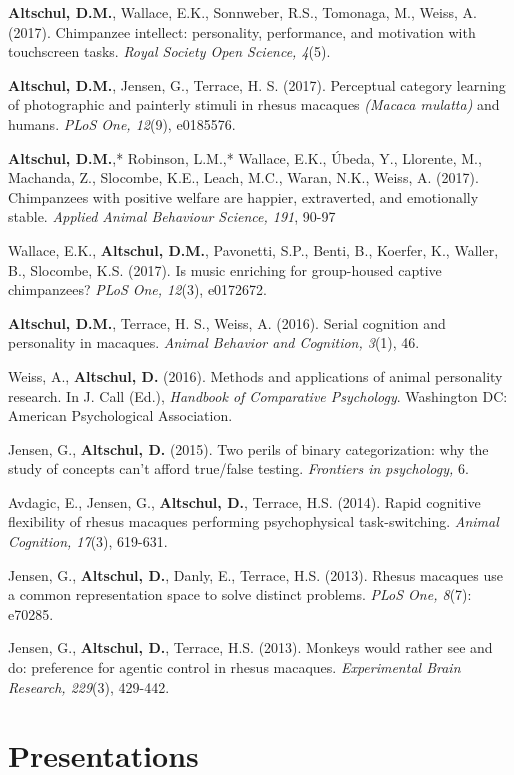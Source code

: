 \documentclass[margin,line]{res}
\begin{document}
\begin{resume}
{\bf Altschul, D.M.}, Wallace, E.K., Sonnweber, R.S., Tomonaga, M., Weiss, A. (2017). Chimpanzee intellect: personality, performance, and motivation with touchscreen tasks. {\it Royal Society Open Science, 4}(5).

{\bf Altschul, D.M.}, Jensen, G.,  Terrace, H. S. (2017). Perceptual category learning of photographic and painterly stimuli in rhesus macaques {\it (Macaca mulatta)} and humans.  {\it PLoS One, 12}(9), e0185576.

{\bf Altschul, D.M.},* Robinson, L.M.,* Wallace, E.K., \'{U}beda, Y., Llorente, M., Machanda, Z., Slocombe, K.E., Leach, M.C., Waran, N.K., Weiss, A. (2017). Chimpanzees with positive welfare are happier, extraverted, and emotionally stable. {\it Applied Animal Behaviour Science, 191}, 90-97

Wallace, E.K., {\bf Altschul, D.M.}, Pavonetti, S.P., Benti, B., Koerfer, K., Waller, B., Slocombe, K.S. (2017). Is music enriching for group-housed captive chimpanzees?  {\it PLoS One, 12}(3), e0172672.

{\bf Altschul, D.M.}, Terrace, H. S., Weiss, A. (2016). Serial cognition and personality in macaques. {\it Animal Behavior and Cognition, 3}(1), 46.

Weiss, A., {\bf Altschul, D.} (2016). Methods and applications of animal personality research. In J. Call (Ed.), {\it Handbook of Comparative Psychology}. Washington DC: American Psychological Association.

Jensen, G., {\bf Altschul, D.} (2015). Two perils of binary categorization: why the study of concepts can't afford true/false testing. {\it Frontiers in psychology,} 6.

Avdagic, E., Jensen, G., {\bf Altschul, D.}, Terrace, H.S. (2014). Rapid cognitive flexibility of rhesus macaques performing psychophysical task-switching. {\it Animal Cognition, 17}(3), 619-631.

Jensen, G., {\bf Altschul, D.}, Danly, E., Terrace, H.S. (2013). Rhesus macaques use a common representation space to solve distinct problems. {\it PLoS One, 8}(7): e70285.

Jensen, G., {\bf Altschul, D.}, Terrace, H.S. (2013). Monkeys would rather see and do: preference for agentic control in rhesus macaques. {\it Experimental Brain Research, 229}(3), 429-442.

\vspace{0.7cm}

\section{\sc Presentations} 



\end{resume}
\end{document}
